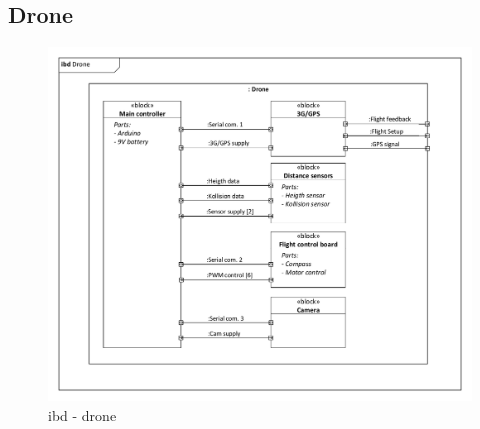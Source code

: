 \subsection{Drone}

\begin{figure}[H]
\centering
\includegraphics[width=1\textwidth]{Billeder/IBD/ibd2_drone.pdf}
\caption{ibd - drone}
\label{fig:ibd_drone}
\end{figure}

